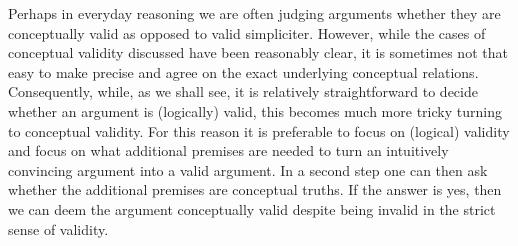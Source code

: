 Perhaps in everyday reasoning we are often judging arguments whether they are conceptually valid as opposed to valid simpliciter. However, while the cases of conceptual validity discussed have been reasonably clear, it is sometimes not that easy to make precise and agree on the exact underlying conceptual relations.
Consequently, while, as we shall see, it is relatively straightforward to decide whether an argument is (logically) valid, this becomes much more tricky turning to conceptual validity. 
For this reason it is preferable to focus on (logical) validity and focus on what additional premises are needed to turn an intuitively convincing argument into a valid argument. In a second step one can then ask whether the additional premises are conceptual truths. If the answer is yes, then we can deem the argument conceptually valid despite being invalid in the strict sense of validity.



